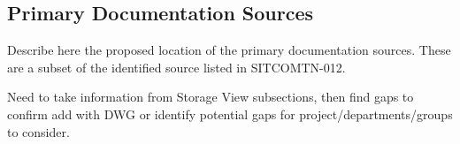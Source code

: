 \subsection{Primary Documentation Sources}
\label{sec:primary-sources}

Describe here the proposed location of the primary documentation sources.  These are a subset of the identified source listed in SITCOMTN-012.

Need to take information from Storage View subsections, then find gaps to confirm add with DWG or identify potential gaps for project/departments/groups to consider.
